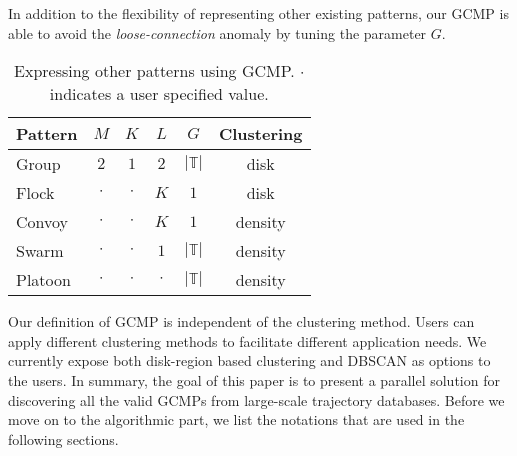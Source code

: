 In addition to the flexibility of representing other existing patterns, our GCMP is able to avoid the \emph{loose-connection} anomaly by tuning the parameter $G$. 
\begin{table}[h]
\centering
\begin{tabular}{|l|c|c|c|c|c|}
\hline 
\textbf{Pattern} & $M$ & $K$ & $L$ & $G$ & \textbf{Clustering} \\ 
\hline
Group & $2$ & $1$ & $2$ & $|\mathbb{T}|$ & disk\\
\hline
Flock & $\cdot$ & $\cdot$ & $K$ & $1$ & disk \\
\hline 
Convoy & $\cdot$ & $\cdot$ & $K$ & $1$ & density\\ 
\hline 
Swarm & $\cdot$ & $\cdot$ & $1$ & $|\mathbb{T}|$ & density\\ 
\hline 
Platoon & $\cdot$ & $\cdot$ & $\cdot$ & $|\mathbb{T}|$ & density\\  
\hline 
\end{tabular} 
\caption{Expressing other patterns using GCMP. $\cdot$ indicates a user specified value.}
\label{tbl:patterns}
\end{table}

Our definition of GCMP is independent of the clustering method. Users can apply different clustering methods to facilitate different application needs. 
We currently expose both disk-region based clustering and DBSCAN as options to the users. In summary, the goal of this paper is to present a parallel solution for discovering all the valid GCMPs from large-scale trajectory databases. Before we move on to the algorithmic part, we list the notations that are used in the following sections.


